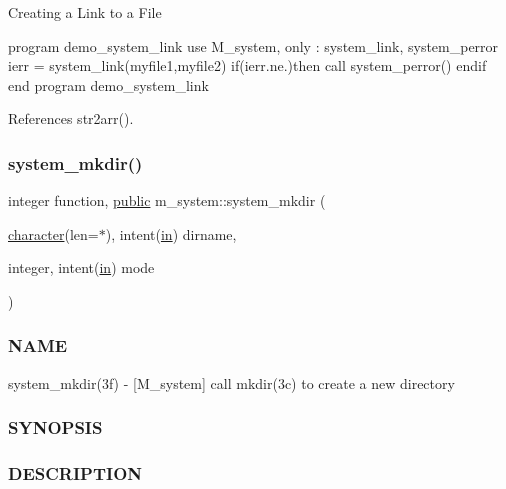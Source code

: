 Creating a Link to a File

program demo\+\_\+system\+\_\+link use M\+\_\+system, only \+: system\+\_\+link, system\+\_\+perror ierr = system\+\_\+link(\textquotesingle{}myfile1\textquotesingle{},\textquotesingle{}myfile2\textquotesingle{}) if(ierr.\+ne.)then call system\+\_\+perror(\textquotesingle{}) endif end program demo\+\_\+system\+\_\+link 

References str2arr().

\mbox{\label{namespacem__system_a084d644c236d22af2cc75c6e48fd6e96}} 
\subsubsection{\texorpdfstring{system\+\_\+mkdir()}{system\_mkdir()}}
{\footnotesize\ttfamily integer function, \hyperlink{M__stopwatch_83_8txt_a2f74811300c361e53b430611a7d1769f}{public} m\+\_\+system\+::system\+\_\+mkdir (\begin{DoxyParamCaption}\item[{\hyperlink{option__stopwatch_83_8txt_abd4b21fbbd175834027b5224bfe97e66}{character}(len=$\ast$), intent(\hyperlink{M__journal_83_8txt_afce72651d1eed785a2132bee863b2f38}{in})}]{dirname,  }\item[{integer, intent(\hyperlink{M__journal_83_8txt_afce72651d1eed785a2132bee863b2f38}{in})}]{mode }\end{DoxyParamCaption})}



\subsubsection*{N\+A\+ME}

system\+\_\+mkdir(3f) -\/ \mbox{[}M\+\_\+system\mbox{]} call mkdir(3c) to create a new directory \subsubsection*{S\+Y\+N\+O\+P\+S\+IS}

\subsubsection*{D\+E\+S\+C\+R\+I\+P\+T\+I\+ON}

